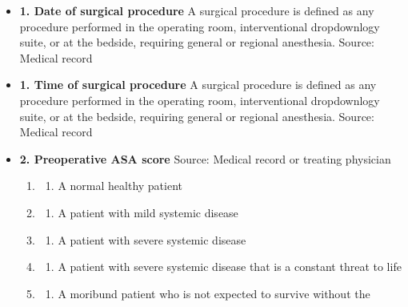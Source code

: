 \documentclass[
]{scrartcl}
\providecommand{\tightlist}{%
  \setlength{\itemsep}{0pt}\setlength{\parskip}{0pt}}\usepackage{longtable,booktabs,array}
\begin{document}
\begin{itemize}
\item
  \textbf{1. Date of surgical procedure} A surgical procedure is defined
  as any procedure performed in the operating room, interventional
  dropdownlogy suite, or at the bedside, requiring general or regional
  anesthesia. Source: Medical record
\item
  \textbf{1. Time of surgical procedure} A surgical procedure is defined
  as any procedure performed in the operating room, interventional
  dropdownlogy suite, or at the bedside, requiring general or regional
  anesthesia. Source: Medical record
\item
  \textbf{2. Preoperative ASA score} Source: Medical record or treating
  physician

  \begin{enumerate}
  \def\labelenumi{\arabic{enumi}.}
  \item
    \begin{enumerate}
    \def\labelenumii{\arabic{enumii}.}
    \tightlist
    \item
      A normal healthy patient
    \end{enumerate}
  \item
    \begin{enumerate}
    \def\labelenumii{\arabic{enumii}.}
    \setcounter{enumii}{1}
    \tightlist
    \item
      A patient with mild systemic disease
    \end{enumerate}
  \item
    \begin{enumerate}
    \def\labelenumii{\arabic{enumii}.}
    \setcounter{enumii}{2}
    \tightlist
    \item
      A patient with severe systemic disease
    \end{enumerate}
  \item
    \begin{enumerate}
    \def\labelenumii{\arabic{enumii}.}
    \setcounter{enumii}{3}
    \tightlist
    \item
      A patient with severe systemic disease that is a constant threat
      to life
    \end{enumerate}
  \item
    \begin{enumerate}
    \def\labelenumii{\arabic{enumii}.}
    \setcounter{enumii}{4}
    \tightlist
    \item
      A moribund patient who is not expected to survive without the

\end{enumerate}
\end{enumerate}
\end{itemize}
\end{document}
